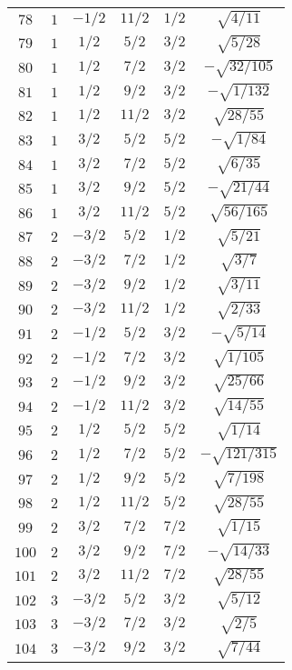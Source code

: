 \begin{table}
\begin{center}
\begin{tabular}{|c|c|c|c|c|c|}
$78$ & $1$ & $-1/2$ & $11/2$ & $1/2$ & $\sqrt{4/11}$ \\ 
$79$ & $1$ & $1/2$ & $5/2$ & $3/2$ & $\sqrt{5/28}$ \\ 
$80$ & $1$ & $1/2$ & $7/2$ & $3/2$ & $-\sqrt{32/105}$ \\ 
$81$ & $1$ & $1/2$ & $9/2$ & $3/2$ & $-\sqrt{1/132}$ \\ 
$82$ & $1$ & $1/2$ & $11/2$ & $3/2$ & $\sqrt{28/55}$ \\ 
$83$ & $1$ & $3/2$ & $5/2$ & $5/2$ & $-\sqrt{1/84}$ \\ 
$84$ & $1$ & $3/2$ & $7/2$ & $5/2$ & $\sqrt{6/35}$ \\ 
$85$ & $1$ & $3/2$ & $9/2$ & $5/2$ & $-\sqrt{21/44}$ \\ 
$86$ & $1$ & $3/2$ & $11/2$ & $5/2$ & $\sqrt{56/165}$ \\ 
$87$ & $2$ & $-3/2$ & $5/2$ & $1/2$ & $\sqrt{5/21}$ \\ 
$88$ & $2$ & $-3/2$ & $7/2$ & $1/2$ & $\sqrt{3/7}$ \\ 
$89$ & $2$ & $-3/2$ & $9/2$ & $1/2$ & $\sqrt{3/11}$ \\ 
$90$ & $2$ & $-3/2$ & $11/2$ & $1/2$ & $\sqrt{2/33}$ \\ 
$91$ & $2$ & $-1/2$ & $5/2$ & $3/2$ & $-\sqrt{5/14}$ \\ 
$92$ & $2$ & $-1/2$ & $7/2$ & $3/2$ & $\sqrt{1/105}$ \\ 
$93$ & $2$ & $-1/2$ & $9/2$ & $3/2$ & $\sqrt{25/66}$ \\ 
$94$ & $2$ & $-1/2$ & $11/2$ & $3/2$ & $\sqrt{14/55}$ \\ 
$95$ & $2$ & $1/2$ & $5/2$ & $5/2$ & $\sqrt{1/14}$ \\ 
$96$ & $2$ & $1/2$ & $7/2$ & $5/2$ & $-\sqrt{121/315}$ \\ 
$97$ & $2$ & $1/2$ & $9/2$ & $5/2$ & $\sqrt{7/198}$ \\ 
$98$ & $2$ & $1/2$ & $11/2$ & $5/2$ & $\sqrt{28/55}$ \\ 
$99$ & $2$ & $3/2$ & $7/2$ & $7/2$ & $\sqrt{1/15}$ \\ 
$100$ & $2$ & $3/2$ & $9/2$ & $7/2$ & $-\sqrt{14/33}$ \\ 
$101$ & $2$ & $3/2$ & $11/2$ & $7/2$ & $\sqrt{28/55}$ \\ 
$102$ & $3$ & $-3/2$ & $5/2$ & $3/2$ & $\sqrt{5/12}$ \\ 
$103$ & $3$ & $-3/2$ & $7/2$ & $3/2$ & $\sqrt{2/5}$ \\ 
$104$ & $3$ & $-3/2$ & $9/2$ & $3/2$ & $\sqrt{7/44}$ \\ 

\end{tabular}
\end{center}
\end{table}
